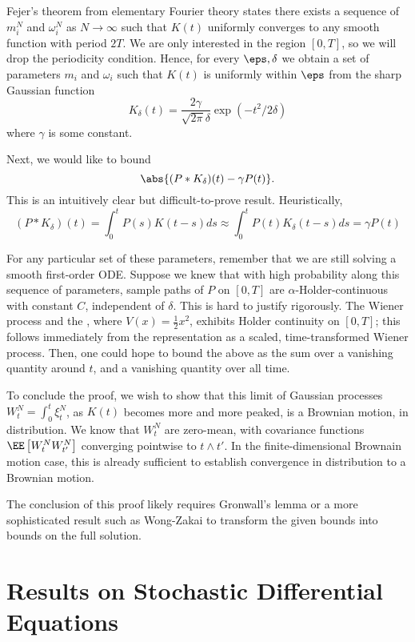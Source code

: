 \documentclass{scrartcl}
\begin{document}
Fejer's theorem from elementary Fourier theory states there exists a sequence of $m^N_i$ and $\omega^N_i$ as $N\to \infty$ such that $K(t)$ uniformly converges to any smooth function with period $2T$. We are only interested in the region $[0,T]$, so we will drop the periodicity condition. Hence, for every $\eps, \delta$ we obtain a set of parameters $m_i$ and $\omega_i$ such that $K(t)$ is uniformly within $\eps$ from the sharp Gaussian function
\[
    K_\delta(t) = \frac{2\gamma}{\sqrt{2\pi}\delta} \exp\left(-t^2/2\delta\right)
\]
where $\gamma$ is some constant.

Next, we would like to bound
\[
    \abs{(P * K_\delta)(t) - \gamma P(t)}.   
\]
This is an intuitively clear but difficult-to-prove result. Heuristically,
\[
    (P * K_\delta)(t) = \int_0^t P(s) K(t-s)ds \approx \int_0^t P(t) K_\delta(t-s)ds = \gamma P(t)
\]

For any particular set of these parameters, remember that we are still solving a smooth first-order ODE. Suppose we knew that with high probability along this sequence of parameters, sample paths of $P$ on $[0,T]$ are $\alpha$-Holder-continuous with constant $C$, independent of $\delta$. This is hard to justify rigorously. The Wiener process and the , where $V(x) = \frac12 x^2$, exhibits Holder continuity on $[0,T]$; this follows immediately from the representation as a scaled, time-transformed Wiener process. Then, one could hope to bound the above as the sum over a vanishing quantity around $t$, and a vanishing quantity over all time.

To conclude the proof, we wish to show that this limit of Gaussian processes $W^N_t = \int_0^t \xi^N_t$, as $K(t)$ becomes more and more peaked, is a Brownian motion, in distribution. We know that $W^N_t$ are zero-mean, with covariance functions $\EE\left[W^N_t W^N_{t'}\right]$ converging pointwise to $t\land t'$. In the finite-dimensional Brownain motion case, this is already sufficient to establish convergence in distribution to a Brownian motion.

The conclusion of this proof likely requires Gronwall's lemma or a more sophisticated result such as Wong-Zakai to transform the given bounds into bounds on the full solution.


\section{Results on Stochastic Differential Equations}
\end{document}
